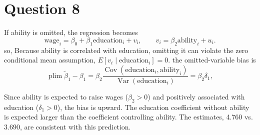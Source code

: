 \section*{Question 8}
If ability is omitted, the regression becomes
\[
\mathrm{wage}_i=\beta_0+\beta_1\mathrm{education}_i+v_i,
\qquad v_i=\beta_2\mathrm{ability}_i+u_i.
\]
so, Because ability is correlated with education, omitting it can violate the
zero conditional mean assumption, $E[v_i\mid\mathrm{education}_i]=0$.
the omitted-variable bias is
\[
\operatorname{plim}\tilde{\beta}_1-\beta_1
=\beta_2\frac{\operatorname{Cov}(\mathrm{education}_i,\mathrm{ability}_i)}
{\operatorname{Var}(\mathrm{education}_i)}
=\beta_2\delta_1,
\]

Since ability is expected to raise wages ($\beta_2>0$) and positively
associated with education ($\delta_1>0$), the bias is upward. The education
coefficient without ability is expected larger than the
coefficient controlling ability. The estimates, 4.760 vs. 3.690,
are consistent with this prediction.
